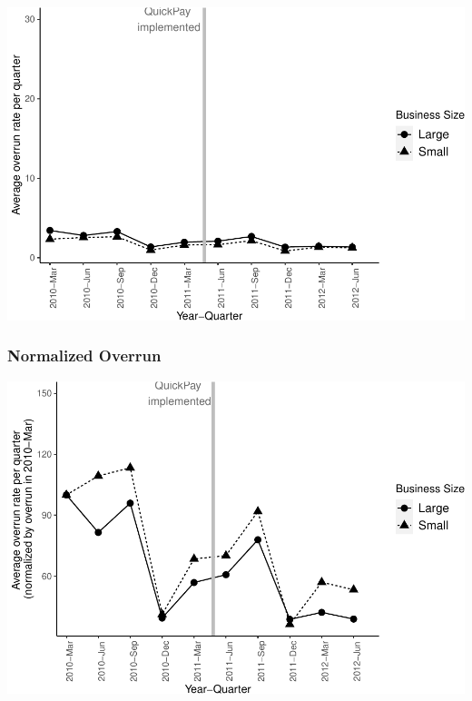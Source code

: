 \documentclass[
]{article}
\begin{document}
\includegraphics{qp_first_budget_overrun_mod_zero_files/figure-latex/plot_pc_overrun-1.pdf}

\hypertarget{normalized-overrun-1}{%
\subsubsection{Normalized Overrun}\label{normalized-overrun-1}}

\includegraphics{qp_first_budget_overrun_mod_zero_files/figure-latex/normalized_pc_plot-1.pdf}
\end{document}
